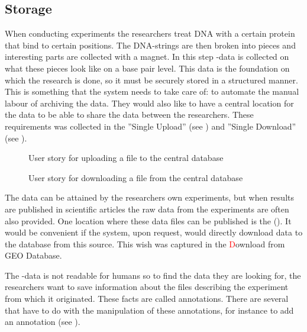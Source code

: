 \subsection{Storage}

When conducting experiments the researchers treat DNA with a certain protein that bind to certain positions. The DNA-strings are then broken into pieces and interesting parts are collected with a magnet. In this step -data is collected on what these pieces look like on a base pair level. This data is the foundation on which the research is done, so it must be securely stored in a structured manner. This is something that the system needs to take care of: to automate the manual labour of archiving the data. They would also like to have a central location for the data to be able to share the  data between the researchers. These requirements was collected in the  ''Single Upload'' (see ) and ''Single Download'' (see ). 

\begin{figure}[h]
\caption{User story for uploading a file to the central database}
\label{fig:target_upload}
\end{figure}

\begin{figure}[h]
\caption{User story for downloading a file from the central database}
\label{fig:target_download}
\end{figure}

The  data can be attained by the researchers own experiments, but when results are published in scientific articles the raw data from the experiments are often also provided. One location where these  data files can be published is the  (). It would be convenient if the system, upon request, would directly download data to the database from this source. This wish was captured in the  {\textcolor{red} Download from GEO Database}. 

The -data is not readable for humans so to find the data they are looking for, the researchers want to save information about the files describing the experiment from which it originated. These facts are called annotations. There are several  that have to do with the manipulation of these annotations, for instance to add an annotation (see ).

